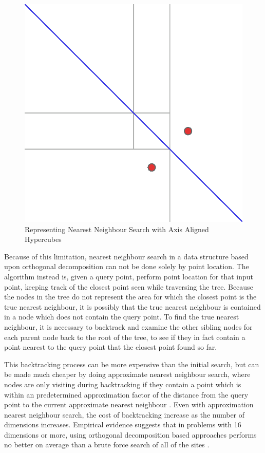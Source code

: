 \documentclass[mcs]{scsthesis}
\begin{document}
\begin{figure}
\begin{center}
\includegraphics[scale=0.5]{diagrams/no_finite_tree.eps}
\caption{Representing Nearest Neighbour Search with Axis Aligned Hypercubes}
\label{fig:no_finite_tree}
\end{center}
\end{figure}

Because of this limitation, nearest neighbour search in a data structure based
upon orthogonal decomposition can not be done solely by point location. The
algorithm instead is, given a query point, perform point location for that
input point, keeping track of the closest point seen while traversing the tree.
Because the nodes in the tree do not represent the area for which the closest
point is the true nearest neighbour, it is possibly that the true nearest
neighbour is contained in a node which does not contain the query point. To
find the true nearest neighbour, it is necessary to backtrack and examine the
other sibling nodes for each parent node back to the root of the tree, to see
if they in fact contain a point nearest to the query point that the closest
point found so far.

This backtracking process can be more expensive than the initial search, but
can be made much cheaper by doing approximate nearest neighbour search, where
nodes are only visiting during backtracking if they contain a point which is
within an predetermined approximation factor of the distance from the query
point to the current approximate nearest neighbour \cite{app-ann}.  Even with
approximation nearest neighbour search, the cost of backtracking increase as
the number of dimensions increases. Empirical evidence suggests that in
problems with 16 dimensions or more, using orthogonal decomposition based
approaches performs no better on average than a brute force search of all of
the sites \cite{fastvector}.
\end{document}
